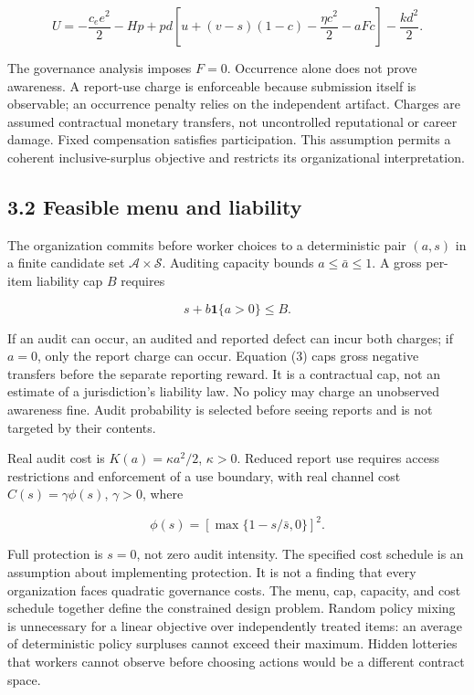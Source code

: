 \documentclass[
  11pt,
]{article}
\begin{document}
\[U=-\frac{c_e e^2}{2}-Hp+
 pd\left[u+(v-s)(1-c)-\frac{\eta c^2}{2}-aFc\right]-\frac{kd^2}{2}. \tag{2}\]

The governance analysis imposes \textbf{\(F=0\)}. Occurrence alone does
not prove awareness. A report-use charge is enforceable because
submission itself is observable; an occurrence penalty relies on the
independent artifact. Charges are assumed contractual monetary
transfers, not uncontrolled reputational or career damage. Fixed
compensation satisfies participation. This assumption permits a coherent
inclusive-surplus objective and restricts its organizational
interpretation.

\subsection{3.2 Feasible menu and
liability}\label{feasible-menu-and-liability}

The organization commits before worker choices to a deterministic pair
\((a,s)\) in a finite candidate set \(\mathcal A\times\mathcal S\).
Auditing capacity bounds \(a\leq\bar a\leq1\). A gross per-item
liability cap \(B\) requires

\[s+b\mathbf1\{a>0\}\leq B. \tag{3}\]

If an audit can occur, an audited and reported defect can incur both
charges; if \(a=0\), only the report charge can occur. Equation (3) caps
gross negative transfers before the separate reporting reward. It is a
contractual cap, not an estimate of a jurisdiction's liability law. No
policy may charge an unobserved awareness fine. Audit probability is
selected before seeing reports and is not targeted by their contents.

Real audit cost is \(K(a)=\kappa a^2/2\), \(\kappa>0\). Reduced report
use requires access restrictions and enforcement of a use boundary, with
real channel cost \(C(s)=\gamma\phi(s)\), \(\gamma>0\), where

\[\phi(s)=\left[\max\{1-s/\bar s,0\}\right]^2. \tag{4}\]

Full protection is \(s=0\), not zero audit intensity. The specified cost
schedule is an assumption about implementing protection. It is not a
finding that every organization faces quadratic governance costs. The
menu, cap, capacity, and cost schedule together define the constrained
design problem. Random policy mixing is unnecessary for a linear
objective over independently treated items: an average of deterministic
policy surpluses cannot exceed their maximum. Hidden lotteries that
workers cannot observe before choosing actions would be a different
contract space.
\end{document}
